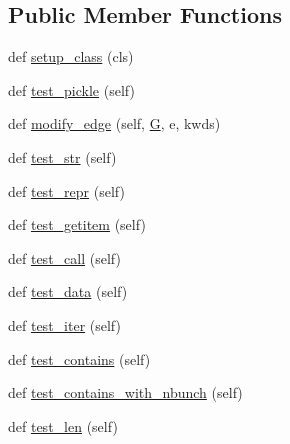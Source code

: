 \subsection*{Public Member Functions}
\begin{DoxyCompactItemize}
\item 
def \hyperlink{classnetworkx_1_1classes_1_1tests_1_1test__reportviews_1_1TestEdgeView_a06b2513c2e5a56d9cad707ddf103d511}{setup\+\_\+class} (cls)
\item 
def \hyperlink{classnetworkx_1_1classes_1_1tests_1_1test__reportviews_1_1TestEdgeView_aa0c9051febdbca15eb221cb2ec88ad62}{test\+\_\+pickle} (self)
\item 
def \hyperlink{classnetworkx_1_1classes_1_1tests_1_1test__reportviews_1_1TestEdgeView_ac4d699032bd20df7a61d71ca7804d081}{modify\+\_\+edge} (self, \hyperlink{classnetworkx_1_1classes_1_1tests_1_1test__reportviews_1_1TestEdgeView_aeada35ed82e4fd893cfcf31f8cf4c0bb}{G}, e, kwds)
\item 
def \hyperlink{classnetworkx_1_1classes_1_1tests_1_1test__reportviews_1_1TestEdgeView_aabdf4d7de4e350c06cf0b3e828f01052}{test\+\_\+str} (self)
\item 
def \hyperlink{classnetworkx_1_1classes_1_1tests_1_1test__reportviews_1_1TestEdgeView_a9d41424c79a9304e09ebd975b24eb5bb}{test\+\_\+repr} (self)
\item 
def \hyperlink{classnetworkx_1_1classes_1_1tests_1_1test__reportviews_1_1TestEdgeView_a40e4cb9d3b7dab5a25d466647eca4474}{test\+\_\+getitem} (self)
\item 
def \hyperlink{classnetworkx_1_1classes_1_1tests_1_1test__reportviews_1_1TestEdgeView_a40d98bf928a529998f9b84f201593529}{test\+\_\+call} (self)
\item 
def \hyperlink{classnetworkx_1_1classes_1_1tests_1_1test__reportviews_1_1TestEdgeView_a86d84c28d70873554530e9c8338fdf51}{test\+\_\+data} (self)
\item 
def \hyperlink{classnetworkx_1_1classes_1_1tests_1_1test__reportviews_1_1TestEdgeView_acb3c55b9d591cc7b42862d65d77b17c0}{test\+\_\+iter} (self)
\item 
def \hyperlink{classnetworkx_1_1classes_1_1tests_1_1test__reportviews_1_1TestEdgeView_ad69e0ac8f6132be0c834bf9b30e02f93}{test\+\_\+contains} (self)
\item 
def \hyperlink{classnetworkx_1_1classes_1_1tests_1_1test__reportviews_1_1TestEdgeView_a2570a265f6f8cba6c24c4c7586f4d31f}{test\+\_\+contains\+\_\+with\+\_\+nbunch} (self)
\item 
def \hyperlink{classnetworkx_1_1classes_1_1tests_1_1test__reportviews_1_1TestEdgeView_a91bd5c5a708fd369eee957356385fd2d}{test\+\_\+len} (self)

\end{DoxyCompactItemize}
